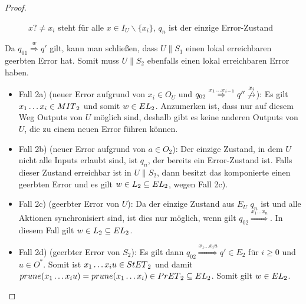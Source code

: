 \begin{proof}
\begin{itemize}
\begin{figure} [h!tbp]
\begin{center}
        \caption{$x?\neq x_i$ steht für alle $x\in I_U\backslash\{x_i\}$, $q_n$
          ist der einzige Error-Zustand}
\label{UmitE}
      \end{center}
      \end{figure}
      Da $q_{01} \overset{w}{\Rightarrow} q'$ gilt, kann man schließen, dass $U\|S_1$
      einen lokal erreichbaren geerbten Error hat. Somit muss $U\|S_2$ ebenfalls einen
      lokal erreichbaren Error haben.
      \begin{itemize}
        \item Fall 2a) (neuer Error aufgrund von $x_i\in O_U$ und $q_{02}
          \overset{x_1\dots x_{i-1}}{\Rightarrow} q''
          \overset{x_i}{\not{\hspace{-0.1cm}\rightarrow}}$): Es gilt $x_1\dots
          x_i\in MIT{}_2$ und somit $w\in EL{}_2$. Anzumerken ist, dass nur
          auf diesem Weg Outputs von $U$ möglich sind, deshalb gibt es keine
          anderen Outputs von $U$, die zu einem neuen Error führen können.
        \item Fall 2b) (neuer Error aufgrund von $a\in O_2$): Der einzige
          Zustand, in dem $U$ nicht alle Inputs erlaubt sind, ist $q_n$, der
          bereits ein Error-Zustand ist. Falls dieser Zustand erreichbar ist in
          $U\|S_2$, dann besitzt das komponierte \EIO{} einen geerbten Error und
          es gilt $w\in L_2\subseteq EL{}_2$, wegen Fall 2c).
        \item Fall 2c) (geerbter Error von $U$): Da der einzige Zustand aus
          $E_U$ $q_n$ ist und alle Aktionen synchronisiert sind, ist dies nur
          möglich, wenn gilt $q_{02} \overset{x_1\dots x_n}{\Rightarrow}$. In
          diesem Fall gilt $w\in L_2\subseteq EL{}_2$.
        \item Fall 2d) (geerbter Error von $S_2$): Es gilt dann $q_{02}
          \overset{x_1\dots x_iu}{\Rightarrow} q'\in E_2$ für $i\geq 0$ und
          $u\in O^*$. Somit ist $x_1\dots x_iu\in StET{}_2$ und damit
          $prune{}(x_1\dots x_iu)=prune{}(x_1\dots x_i)\in PrET{}_2\subseteq
          EL{}_2$. Somit gilt $w\in EL{}_2$.
      \end{itemize}
  \end{itemize}
\end{proof}

